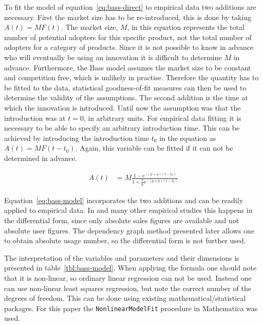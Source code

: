\documentclass[smallextended,final]{svjour3}
\newcommand{\e}{\mathrm{e}}
\begin{document}
To fit the model of equation~\eqref{eq:bass-direct} to empirical data two additions are necessary. First the market size has to be re-introduced, this is done by taking $A(t) = M F(t)$. The market size, $M$, in this equation represents the total number of potential adopters for this specific product, not the total number of adopters for a category of products. Since it is not possible to know in advance who will eventually be using an innovation it is difficult to determine $M$ in advance. Furthermore, the Bass model assumes the market size to be constant and competition free, which is unlikely in practise. Therefore the quantity has to be fitted to the data, statistical goodness-of-fit measures can then be used to determine the validity of the assumptions. The second addition is the time at which the innovation is introduced. Until now the assumption was that the introduction was at $t=0$, in arbitrary units. For empirical data fitting it is necessary to be able to specify an arbitrary introduction time. This can be achieved by introducing the introduction time $t_0$ in the equation as $A(t) = M F(t - t_0)$. Again, this variable can be fitted if it can not be determined in advance.

\begin{align} \label{eq:bass-model}
	A(t) &= M \frac{1 - \e^{-(p+q)(t-t_0)}}{1 + \frac{q}{p}\e^{-(p+q)(t-t_0)}}
\end{align}

Equation~\eqref{eq:bass-model} incorporates the two additions and can be readily applied to empirical data. In \citep{mahajan95} and many other empirical studies this happens in the differential form, since only absolute sales figures are available and not absolute user figures. The dependency graph method presented later allows one to obtain absolute usage number, so the differential form is not further used. 

The interpretation of the variables and parameters and their dimensions is presented in table~\ref{tbl:bass-model}. When applying the formula one should note that it is non-linear, so ordinary linear regression can not be used. Instead one can use non-linear least squares regression, but note the correct number of the degrees of freedom. This can be done using existing mathematical/statistical packages. For this paper the \verb|NonlinearModelFit| procedure in Mathematica was used. 
\end{document}
